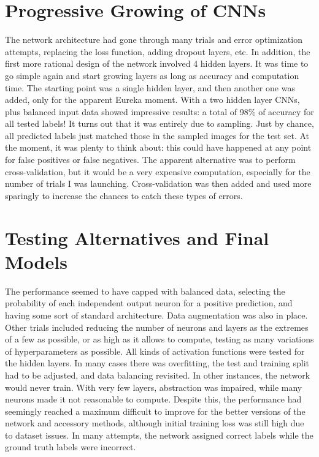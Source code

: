 \documentclass{article}
\begin{document}
\section{Progressive Growing of CNNs}
The network architecture had gone through many trials and error optimization attempts, replacing the loss function, adding dropout layers, etc.
In addition, the first more rational design of the network involved 4 hidden layers.
It was time to go simple again and start growing layers as long as accuracy and computation time.
The starting point was a single hidden layer, and then another one was added, only for the apparent Eureka moment.
With a two hidden layer CNNs, plus balanced input data showed impressive results: a total of 98\% of accuracy for all tested labels!
It turns out that it was entirely due to sampling.
Just by chance, all predicted labels just matched those in the sampled images for the test set.
At the moment, it was plenty to think about: this could have happened at any point for false positives or false negatives.
The apparent alternative was to perform cross-validation, but it would be a very expensive computation, especially for the number of trials I was launching.
Cross-validation was then added and used more sparingly to increase the chances to catch these types of errors.


\section{Testing Alternatives and Final Models}
The performance seemed to have capped with balanced data, selecting the probability of each independent output neuron for a positive prediction, and having some sort of standard architecture.
Data augmentation was also in place.
Other trials included reducing the number of neurons and layers as the extremes of a few as possible, or as high as it allows to compute, testing as many variations of hyperparameters as possible.
All kinds of activation functions were tested for the hidden layers.
In many cases there was overfitting, the test and training split had to be adjusted, and data balancing revisited.
In other instances, the network would never train.
With very few layers, abstraction was impaired, while many neurons made it not reasonable to compute.
Despite this, the performance had seemingly reached a maximum difficult to improve for the better versions of the network and accessory methods, although initial training loss was still high due to dataset issues.
In many attempts, the network assigned correct labels while the ground truth labels were incorrect.
\end{document}
